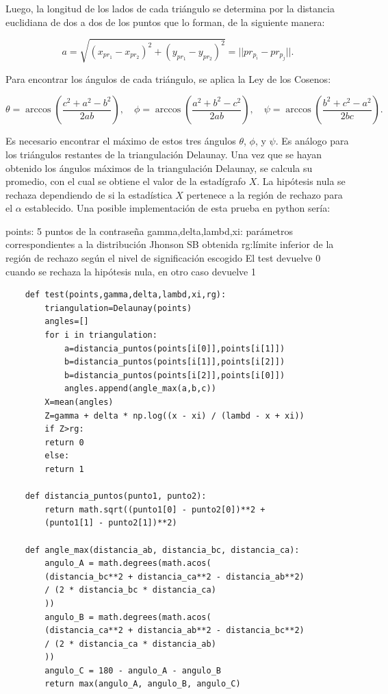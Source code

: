 \documentclass[12pt]{report}
\begin{document}
Luego, la longitud de los lados de cada triángulo se determina por la distancia euclidiana de dos a dos de los puntos que lo forman, de la siguiente manera:

\[
a = \sqrt{(x_{pr_1} - x_{pr_2})^2 + (y_{pr_1} - y_{pr_2})^2} = ||pr_{p_i} - pr_{p_j}||.
\]

Para encontrar los ángulos de cada triángulo, se aplica la Ley de los Cosenos:

\[
\theta = \arccos\left(\frac{c^2 + a^2 - b^2}{2ab}\right), \quad \phi = \arccos\left(\frac{a^2 + b^2 - c^2}{2ab}\right), \quad \psi = \arccos\left(\frac{b^2 + c^2 - a^2}{2bc}\right).
\]

Es necesario encontrar el máximo de estos tres ángulos \(\theta\), \(\phi\), y \(\psi\). Es análogo para los triángulos restantes de la triangulación Delaunay. Una vez que se hayan obtenido los ángulos máximos de la triangulación Delaunay, se calcula su promedio, con el cual se obtiene el valor de la estadígrafo \(X\). La hipótesis nula se rechaza dependiendo de si la estadística \(X\) pertenece a la región de rechazo para el \(\alpha\) establecido. Una posible implementación de esta prueba en python sería:

points: 5 puntos de la contraseña 
gamma,delta,lambd,xi: parámetros correspondientes a la distribución Jhonson SB obtenida
rg:límite inferior de la región de rechazo según el nivel de significación escogido  
El test devuelve 0 cuando se rechaza la hipótesis nula, en otro caso devuelve 1



\begin{lstlisting}
	def test(points,gamma,delta,lambd,xi,rg):
		triangulation=Delaunay(points)
		angles=[]
		for i in triangulation:
			a=distancia_puntos(points[i[0]],points[i[1]])
			b=distancia_puntos(points[i[1]],points[i[2]])
			b=distancia_puntos(points[i[2]],points[i[0]])
			angles.append(angle_max(a,b,c))
		X=mean(angles)
		Z=gamma + delta * np.log((x - xi) / (lambd - x + xi))
		if Z>rg:
		return 0
		else:
		return 1
	
	def distancia_puntos(punto1, punto2):
		return math.sqrt((punto1[0] - punto2[0])**2 +
		(punto1[1] - punto2[1])**2)
	
	def angle_max(distancia_ab, distancia_bc, distancia_ca):
		angulo_A = math.degrees(math.acos(
		(distancia_bc**2 + distancia_ca**2 - distancia_ab**2) 
		/ (2 * distancia_bc * distancia_ca)
		))
		angulo_B = math.degrees(math.acos(
		(distancia_ca**2 + distancia_ab**2 - distancia_bc**2) 
		/ (2 * distancia_ca * distancia_ab)
		))
		angulo_C = 180 - angulo_A - angulo_B  
		return max(angulo_A, angulo_B, angulo_C)
\end{lstlisting}
\end{document}
